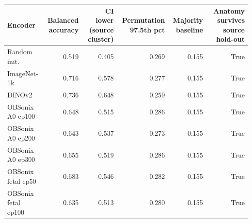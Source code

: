 \begin{tabular}{lrrrrr}
\toprule
Encoder & Balanced accuracy & CI lower (source cluster) & Permutation 97.5th pct & Majority baseline & Anatomy survives source hold-out \\
\midrule
Random init. & 0.519 & 0.405 & 0.269 & 0.155 & True \\
ImageNet-1k & 0.716 & 0.578 & 0.277 & 0.155 & True \\
DINOv2 & 0.736 & 0.648 & 0.259 & 0.155 & True \\
OBSonix A0 ep100 & 0.648 & 0.515 & 0.286 & 0.155 & True \\
OBSonix A0 ep200 & 0.643 & 0.537 & 0.273 & 0.155 & True \\
OBSonix A0 ep300 & 0.655 & 0.519 & 0.286 & 0.155 & True \\
OBSonix fetal ep50 & 0.683 & 0.546 & 0.282 & 0.155 & True \\
OBSonix fetal ep100 & 0.635 & 0.513 & 0.280 & 0.155 & True \\
\bottomrule
\end{tabular}
